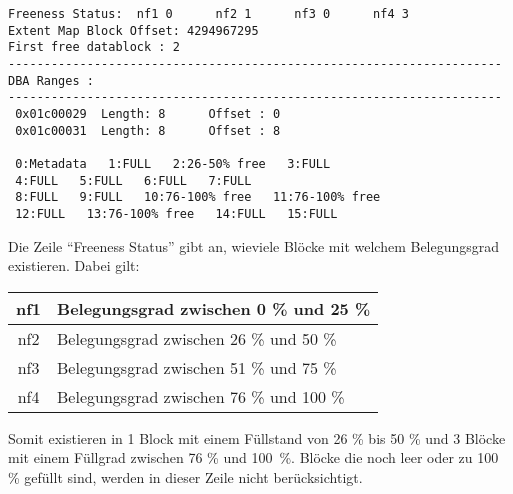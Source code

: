           \begin{lstlisting}[caption={Der Inhalt eines Level 1 Bitmap-Blocks},label=admin101,emph={[9]FULL},emphstyle={[9]\color{black}},language=terminal]
Freeness Status:  nf1 0      nf2 1      nf3 0      nf4 3
Extent Map Block Offset: 4294967295
First free datablock : 2
---------------------------------------------------------------------
DBA Ranges :
---------------------------------------------------------------------
 0x01c00029  Length: 8      Offset : 0
 0x01c00031  Length: 8      Offset : 8

 0:Metadata   1:FULL   2:26-50% free   3:FULL
 4:FULL   5:FULL   6:FULL   7:FULL
 8:FULL   9:FULL   10:76-100% free   11:76-100% free
 12:FULL   13:76-100% free   14:FULL   15:FULL

          \end{lstlisting}
          Die Zeile \enquote{Freeness Status} gibt an, wieviele Bl\"ocke mit welchem Belegungsgrad existieren. Dabei gilt:
          \begin{center}
            \tabletail{
              \hline
            }
            \begin{supertabular}[h]{|c|l|}
              nf1 & Belegungsgrad zwischen 0 \% und 25 \% \\
              \hline
              nf2 & Belegungsgrad zwischen 26 \% und 50 \%  \\
              \hline
              nf3 & Belegungsgrad zwischen 51 \% und 75 \%  \\
              \hline
              nf4 & Belegungsgrad zwischen 76 \% und 100 \% \\
            \end{supertabular}
          \end{center}
          Somit existieren in  1 Block mit einem F\"ullstand von 26 \% bis 50 \% und 3 Bl\"ocke mit einem F\"ullgrad zwischen 76 \% und 100~\%. Bl\"ocke die noch leer oder zu 100 \% gef\"ullt sind, werden in dieser Zeile nicht ber\"ucksichtigt.

